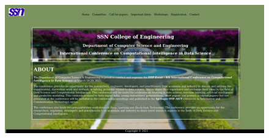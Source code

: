 \documentclass[12pt,letterpaper]{article}
\begin{document}
\subsubsection*{}
\begin{flushleft}

\end{flushleft}

\subsubsection*{}
\begin{flushleft}

\end{flushleft}

\subsubsection*{}
\begin{flushleft}

\end{flushleft}

\subsubsection*{}
\begin{flushleft}

\end{flushleft}

\newpage
\subsection*{}
\subsubsection*{}
\begin{figure}[h]
    \centering
    \includegraphics[width = \textwidth]{Pics/Home.png}
\end{figure}
\end{document}
